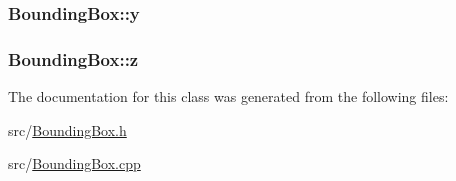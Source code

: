 \subsubsection[{\texorpdfstring{y}{y}}]{ Bounding\+Box\+::y\hspace{0.3cm}{\ttfamily [private]}}\hypertarget{classBoundingBox_a593fd6b66d3ed0352d92024685863090}{}\label{classBoundingBox_a593fd6b66d3ed0352d92024685863090}
\subsubsection[{\texorpdfstring{z}{z}}]{ Bounding\+Box\+::z\hspace{0.3cm}{\ttfamily [private]}}\hypertarget{classBoundingBox_a9a6005ebe3550447aad804123fa68fea}{}\label{classBoundingBox_a9a6005ebe3550447aad804123fa68fea}


The documentation for this class was generated from the following files\+:\begin{DoxyCompactItemize}
\item 
src/\hyperlink{BoundingBox_8h}{Bounding\+Box.\+h}\item 
src/\hyperlink{BoundingBox_8cpp}{Bounding\+Box.\+cpp}\end{DoxyCompactItemize}
